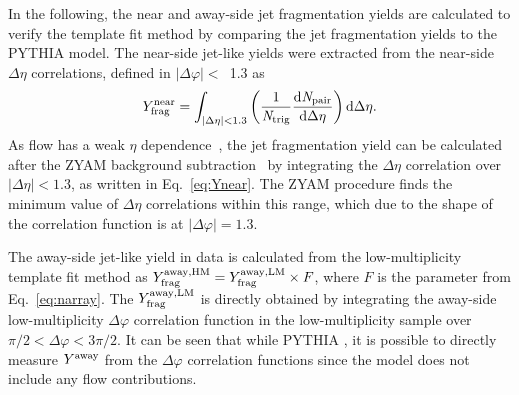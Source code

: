 In the following, the near and away-side jet fragmentation yields are calculated to verify the template fit method by comparing the jet fragmentation yields to the PYTHIA model.
The near-side jet-like yields were extracted from the near-side $\Delta\eta$ correlations, defined in $|\Delta\varphi|<$~1.3 as
\begin{eqnarray}
Y^\mathrm{near}_{\rm{frag}} = \int_{|\Delta \eta|<1.3} \left( \frac{1}{\it{N}_{\rm{trig}}} \frac{ \rm{d}\it{}N_{\rm{pair}} }{ \rm{d}\Delta\eta } \right) \rm{d} \Delta\eta.
\label{eq:Ynear}
\end{eqnarray}
As flow has a weak $\eta$ dependence~\cite{ATLAS:2011ah,PHENIX:2018hho,ALICE:2016tlx}, the jet fragmentation yield can be calculated after the ZYAM background subtraction~\cite{Ajitanand:2005jj} by integrating the $\Delta\eta$ correlation over $|\Delta\eta|<1.3$, as written in Eq.~\ref{eq:Ynear}. The ZYAM procedure finds the minimum value of $\Delta\eta$ correlations within this range, which due to the shape of the correlation function is at $|\Delta\varphi|=1.3$.


The away-side jet-like yield in data is calculated from the low-multiplicity template fit method as $Y^{\rm{away, HM}}_{\mathrm{frag}} = Y^{\rm{away, LM}}_{\mathrm{frag}} \times F$, where $F$ is the parameter from Eq.~\ref{eq:narray}. The $Y^{\rm{away, LM}}_{\mathrm{frag}}$ is directly obtained by integrating the away-side low-multiplicity $\Delta\varphi$ correlation function in the low-multiplicity sample over $\pi/2 < \Delta\varphi < 3\pi/2$.
It can be seen that while PYTHIA
, it is possible to directly measure  $Y^{\rm{away}}$ from the $\Delta\varphi$ correlation functions since the model does not include any flow contributions.

